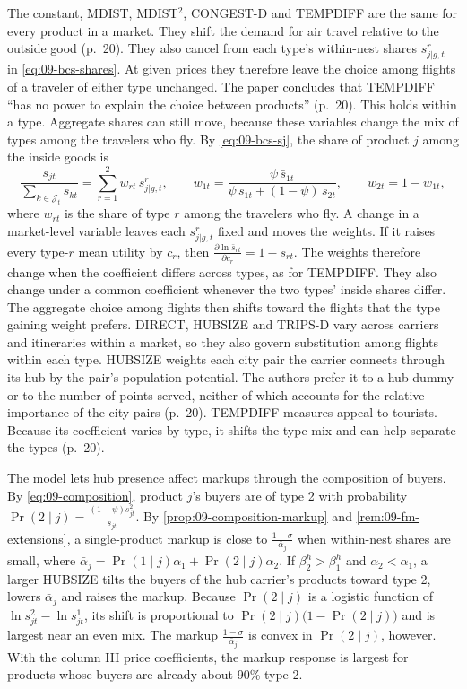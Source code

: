 The constant, MDIST, MDIST$^2$, CONGEST-D and TEMPDIFF are the same for every product in a market. They
shift the demand for air travel relative to the outside good (p.~20). They also cancel from each type's
within-nest shares $s^r_{j|g,t}$ in \eqref{eq:09-bcs-shares}. At given prices they therefore leave the
choice among flights of a traveler of either type unchanged. The paper concludes that TEMPDIFF ``has no
power to explain the choice between products'' (p.~20). This holds within a type. Aggregate shares can
still move, because these variables change the mix of types among the travelers who fly. By
\eqref{eq:09-bcs-sj}, the share of product $j$ among the inside goods is
\begin{equation*}
\frac{s_{jt}}{\sum_{k\in\mathcal{J}_t}s_{kt}}=\sum_{r=1}^{2}w_{rt}\,s^r_{j|g,t},\qquad
w_{1t}=\frac{\psi\,\bar s_{1t}}{\psi\,\bar s_{1t}+(1-\psi)\,\bar s_{2t}},\qquad w_{2t}=1-w_{1t},
\end{equation*}
where $w_{rt}$ is the share of type $r$ among the travelers who fly. A change in a market-level variable
leaves each $s^r_{j|g,t}$ fixed and moves the weights. If it raises every type-$r$ mean utility by $c_r$,
then $\frac{\partial\ln\bar s_{rt}}{\partial c_r}=1-\bar s_{rt}$. The weights therefore change when the
coefficient differs across types, as for TEMPDIFF. They also change under a common coefficient whenever
the two types' inside shares differ. The aggregate choice among flights then shifts toward the flights
that the type gaining weight prefers. DIRECT, HUBSIZE and TRIPS-D vary across carriers and itineraries within a market,
so they also govern substitution among flights within each type. HUBSIZE weights each city pair the carrier connects through its hub by
the pair's population potential. The authors prefer it to a hub dummy or to the number of points served,
neither of which accounts for the relative importance of the city pairs (p.~20). TEMPDIFF measures appeal to
tourists. Because its coefficient varies by type, it shifts the type mix and can help separate the types
(p.~20).

The model lets hub presence affect markups through the composition of buyers. By \eqref{eq:09-composition},
product $j$'s buyers are of type 2 with probability $\Pr(2\mid j)=\frac{(1-\psi)s^2_{jt}}{s_{jt}}$. By
\cref{prop:09-composition-markup} and \cref{rem:09-fm-extensions}, a single-product markup is close to
$\frac{1-\sigma}{\bar\alpha_j}$ when within-nest shares are small, where
$\bar\alpha_j=\Pr(1\mid j)\alpha_1+\Pr(2\mid j)\alpha_2$. If $\beta^h_2>\beta^h_1$ and $\alpha_2<\alpha_1$,
a larger HUBSIZE tilts the buyers of the hub carrier's products toward type 2, lowers $\bar\alpha_j$ and
raises the markup. Because $\Pr(2\mid j)$ is a logistic function of $\ln s^2_{jt}-\ln s^1_{jt}$, its shift
is proportional to $\Pr(2\mid j)\big(1-\Pr(2\mid j)\big)$ and is largest near an even mix. The markup
$\frac{1-\sigma}{\bar\alpha_j}$ is convex in $\Pr(2\mid j)$, however. With the column III price coefficients,
the markup response is largest for products whose buyers are already about 90\% type 2.


